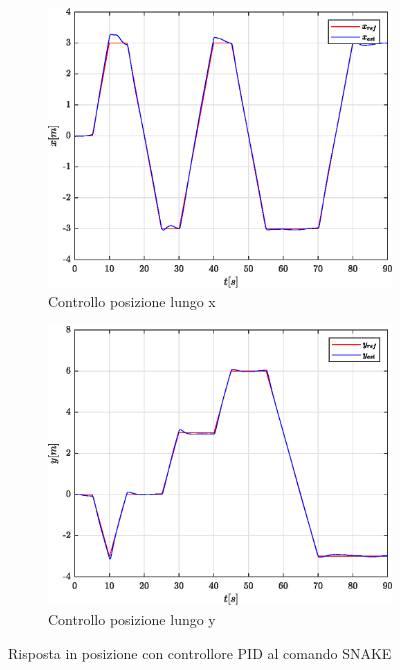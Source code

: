 \begin{figure}
	\centering
	\begin{subfigure}{0.45\textwidth}
		\centering
		\includegraphics[width=1\textwidth]{Simulazioni/Figure/PID/SNAKE/PositionControlXPos}
		\caption{Controllo posizione lungo x}
		\label{fig:SNAKEerrposxPID}
	\end{subfigure}
	\hfill
	\begin{subfigure}{0.45\textwidth}
		\centering
		\includegraphics[width=1\textwidth]{Simulazioni/Figure/PID/SNAKE/PositionControlYPos}
		\caption{Controllo posizione lungo y}
		\label{fig:SNAKEerrposyPID}
	\end{subfigure}
	\caption{Risposta in posizione con controllore PID al comando SNAKE}
\end{figure}

